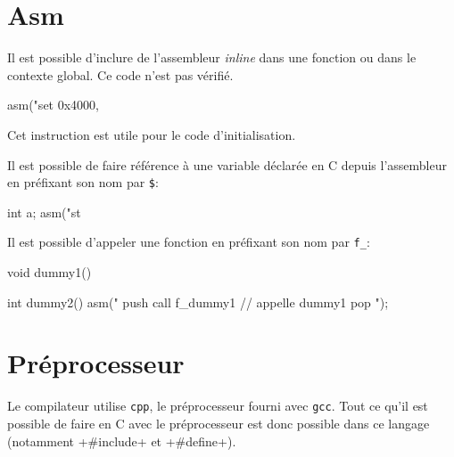 \documentclass[a4paper]{article}
\begin{document}
  \section{Asm}
    Il est possible d'inclure de l'assembleur \emph{inline} dans une fonction ou
    dans le contexte global. Ce code n'est pas vérifié.

    \begin{moc}
asm("set 0x4000, %
    \end{moc}

    Cet instruction est utile pour le code d'initialisation.

    Il est possible de faire référence à une variable déclarée en C depuis
    l'assembleur en préfixant son nom par \verb+$+:
    \begin{moc}
int a;
asm("st %
    \end{moc}

    Il est possible d'appeler une fonction en préfixant son nom par \verb+f_+:
    \begin{moc}
void dummy1() {
}

int dummy2() {
    asm("
        push %
        call f_dummy1 // appelle dummy1
        pop %
    ");
}
    \end{moc}

  \section{Préprocesseur}
    Le compilateur utilise \verb+cpp+, le préprocesseur fourni avec \verb+gcc+.
    Tout ce qu'il est possible de faire en C avec le préprocesseur est donc
    possible dans ce langage (notamment \imoc+#include+ et \imoc+#define+).
\end{document}
